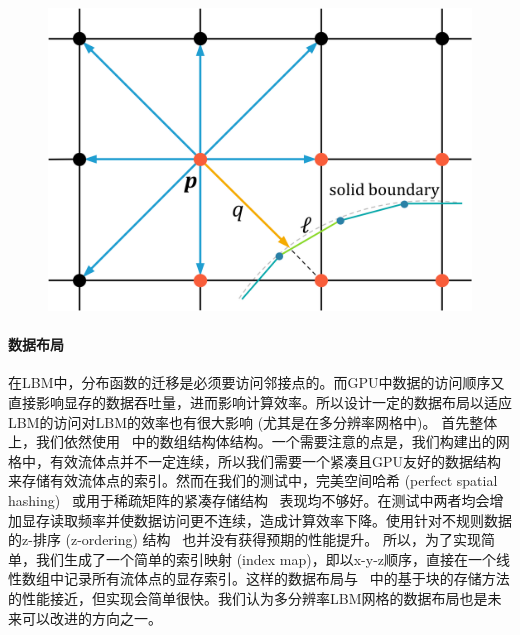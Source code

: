 \begin{figure}[htb]
  \centering
    \includegraphics[width=0.7\columnwidth]{figures/intersection.png}
  \label{img:intersection}
\end{figure}

\paragraph{数据布局}
在LBM中，分布函数的迁移是必须要访问邻接点的。而GPU中数据的访问顺序又直接影响显存的数据吞吐量，进而影响计算效率。所以设计一定的数据布局以适应LBM的访问对LBM的效率也有很大影响 (尤其是在多分辨率网格中)。
首先整体上，我们依然使用~\citep{Chen-2021} 中的数组结构体结构。一个需要注意的点是，我们构建出的网格中，有效流体点并不一定连续，所以我们需要一个紧凑且GPU友好的数据结构来存储有效流体点的索引。然而在我们的测试中，完美空间哈希 (perfect spatial hashing)~\citep{Lefebvre-2006} 或用于稀疏矩阵的紧凑存储结构~\citep{Greathouse-2014} 表现均不够好。在测试中两者均会增加显存读取频率并使数据访问更不连续，造成计算效率下降。使用针对不规则数据的z-排序 (z-ordering) 结构~\citep{Chen-2021} 也并没有获得预期的性能提升。
所以，为了实现简单，我们生成了一个简单的索引映射 (index map)，即以x-y-z顺序，直接在一个线性数组中记录所有流体点的显存索引。这样的数据布局与~\citep{Chen-2021} 中的基于块的存储方法的性能接近，但实现会简单很快。我们认为多分辨率LBM网格的数据布局也是未来可以改进的方向之一。

